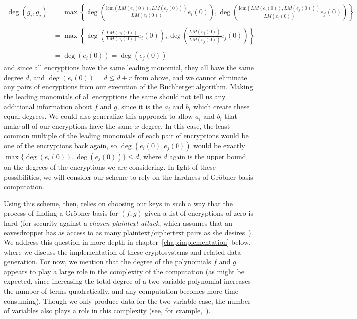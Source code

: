 \documentclass[11pt]{report}
\begin{document}
\begin{align*}
\deg(g_i,g_j) &= \max\left\{\deg\left(\frac{\text{lcm}(LM(e_i(0)),LM(e_j(0)))}{LM(e_i(0))}e_i(0)\right),
\deg\left(\frac{\text{lcm}(LM(e_i(0)),LM(e_j(0)))}{LM(e_j(0))}e_j(0)\right)\right\} \\
\\
&= \max\left\{\deg\left(\frac{LM(e_i(0))}{LM(e_i(0))}e_i(0)\right),
\deg\left(\frac{LM(e_j(0))}{LM(e_j(0))}e_j(0)\right)\right\} \\ \\
&= \deg(e_i(0)) = \deg(e_j(0))
\end{align*}
and since all encryptions have the same leading monomial, they all have the same degree $d$, and $\deg(e_i(0)) = d \leq d+r$ from above, and we cannot eliminate any pairs of encryptions from our execution of the Buchberger algorithm. Making the leading monomials of all encryptions the same should not tell us any additional information about $f$ and $g$, since it is the $a_i$ and $b_i$ which create these equal degrees. We could also generalize this approach to allow $a_i$ and $b_i$ that make all of our encryptions have the same $x$-degree. In this case, the least common multiple of the leading monomials of each pair of encryptions would be one of the encryptions back again, so $\deg(e_i(0),e_j(0))$ would be exactly $\max\{\deg(e_i(0)),\deg(e_j(0))\} \leq d$, where $d$ again is the upper bound on the degrees of the encryptions we are considering. In light of these possibilities, we will consider our scheme to rely on the hardness of Gr\"obner basis computation.


Using this scheme, then, relies on choosing our keys in such a way that the process of finding a Gr\"obner basis for $(f,g)$ given a list of encryptions of zero is hard (for security against a \emph{chosen plaintext attack}, which assumes that an eavesdropper has as access to as many plaintext/ciphertext pairs as she desires~\cite{hoff-piph-silv}). We address this question in more depth in chapter~\ref{chap:implementation} below, where we discuss the implementation of these cryptosystems and related data generation. For now, we mention that the degree of the polynomials $f$ and $g$ appears to play a large role in the complexity of the computation (as might be expected, since increasing the total degree of a two-variable polynomial increases the number of terms quadratically, and any computation becomes more time-consuming). Though we only produce data for the two-variable case, the number of variables also plays a role in this complexity (see, for example,~\cite{bayer-stillman}).
\end{document}
